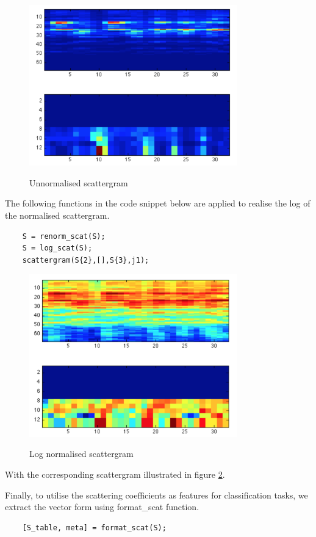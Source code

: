 \begin{figure}
\centering
  \includegraphics[width=9cm]{thesis/images/wscat0}\\
  \caption{Unnormalised scattergram}\label{fig_c3_sgram00}
\end{figure}

The following functions in the code snippet below are applied to realise the log of the normalised scattergram.
\begin{verbatim}
    S = renorm_scat(S);
    S = log_scat(S);
    scattergram(S{2},[],S{3},j1);
\end{verbatim}

\begin{figure}
\centering
  \includegraphics[width=9cm]{thesis/images/wscat1}\\
  \caption{Log normalised scattergram}\label{fig_c3_sgram01}
\end{figure}

With the corresponding scattergram illustrated in figure \ref{fig_c3_sgram01}.

Finally, to utilise the scattering coefficients as features for classification tasks, we extract the vector form using format_scat function.
\begin{verbatim}
    [S_table, meta] = format_scat(S);
\end{verbatim}


